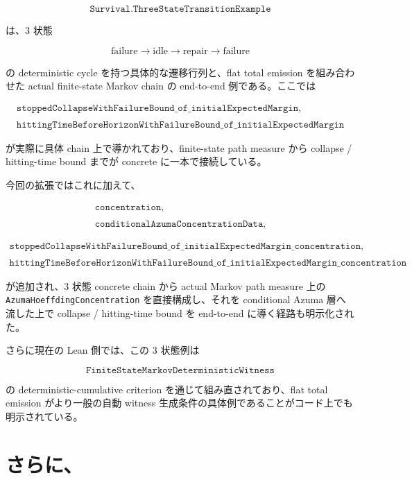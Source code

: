 \documentclass[12pt,a4paper]{article}
\begin{document}
\[
\texttt{Survival.ThreeStateTransitionExample}
\]

は、3 状態

\[
\text{failure}\to\text{idle}\to\text{repair}\to\text{failure}
\]

の deterministic cycle を持つ具体的な遷移行列と、flat total emission を組み合わせた actual finite-state Markov chain の end-to-end 例である。ここでは

\[
\begin{aligned}
\texttt{stoppedCollapseWithFailureBound\_of\_initialExpectedMargin}, \\
\qquad \\
\texttt{hittingTimeBeforeHorizonWithFailureBound\_of\_initialExpectedMargin}
\end{aligned}
\]

が実際に具体 chain 上で導かれており、finite-state path measure から collapse / hitting-time bound までが concrete に一本で接続している。

今回の拡張ではこれに加えて、

\[
\begin{aligned}
\texttt{concentration}, \\
\qquad \\
\texttt{conditionalAzumaConcentrationData},
\end{aligned}
\]

\[
\begin{aligned}
\texttt{stoppedCollapseWithFailureBound\_of\_initialExpectedMargin\_concentration}, \\
\qquad \\
\texttt{hittingTimeBeforeHorizonWithFailureBound\_of\_initialExpectedMargin\_concentration}
\end{aligned}
\]

が追加され、3 状態 concrete chain から actual Markov path measure 上の \texttt{AzumaHoeffdingConcentration} を直接構成し、それを conditional Azuma 層へ流した上で collapse / hitting-time bound を end-to-end に導く経路も明示化された。

さらに現在の Lean 側では、この 3 状態例は

\[
\texttt{FiniteStateMarkovDeterministicWitness}
\]

の deterministic-cumulative criterion を通じて組み直されており、flat total emission がより一般の自動 witness 生成条件の具体例であることがコード上でも明示されている。

\section{さらに、}\label{ux3055ux3089ux306b-4}
\end{document}

